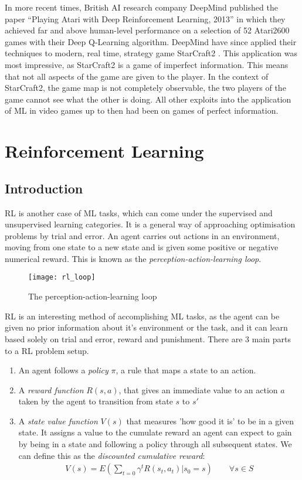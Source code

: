 In more recent times, British AI research company DeepMind published the paper ``Playing Atari with
Deep Reinforcement Learning, 2013'' \cite{deepmind1} in which they achieved far and above
human-level performance on a selection of 52 Atari2600 games with their Deep Q-Learning algorithm.
DeepMind have since applied their techniques to modern, real time, strategy game StarCraft2
\cite{starcraft}. This application was most impressive, as StarCraft2 is a game of imperfect
information. This means that not all aspects of the game are given to the player. In the context of
StarCraft2, the game map is not completely observable, the two players of the game cannot see what
the other is doing. All other exploits into the application of ML in video games up to then had been
on games of perfect information.

\section{Reinforcement Learning}
\subsection{Introduction}
RL is another case of ML tasks, which can come under the supervised and unsupervised learning
categories. It is a general way of approaching optimisation problems by trial and error. An agent
carries out actions in an environment, moving from one state to a new state and is given some
positive or negative numerical reward. This is known as the \textit{perception-action-learning
    loop}.

\begin{figure}[h]
    \texttt{[image: rl\_loop]}
    \centering
    \caption{The perception-action-learning loop}
\end{figure}

RL is an interesting method of accomplishing ML tasks, as the agent can be given no prior
information about it's environment or the task, and it can learn based solely on trial and error,
reward and punishment. There are 3 main parts to a RL problem setup.

\begin{enumerate}
    \item An agent follows a \textit{policy} $\pi$, a rule that maps a state to an action.
    \item A \textit{reward function} $R(s, a)$, that gives an immediate value to an action $a$ taken
          by the agent to transition from state $s$ to $s'$
    \item A \textit{state value function} $V(s)$ that measures 'how good it is' to be in a given
          state. It assigns a value to the cumulate reward an agent can expect to gain by being in a
          state and following a policy through all subsequent states. We can define this as the
          \textit{discounted cumulative reward}:
          \begin{align*}
              V(s) = E(\sum_{t=0}\gamma^tR(s_t, a_t) | s_0 = s) \qquad \forall s \in S
          \end{align*}
\end{enumerate}

